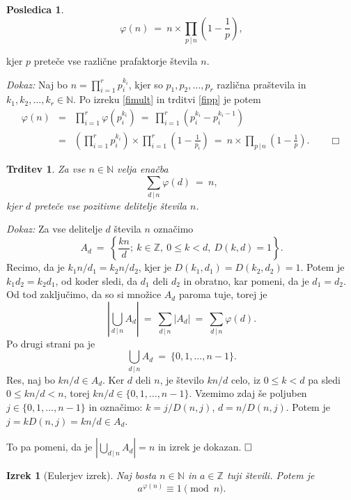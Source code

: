 \documentclass[a4paper,12pt]{article}
\def\N{\mathbb{N}} %
\def\Z{\mathbb{Z}} %
\def\qed{$\hfill\Box$}   %
\def\qedm{\qquad\Box}   %
\newtheorem{izrek}{Izrek}
\newtheorem{trditev}{Trditev}
\newtheorem{posledica}{Posledica}
\begin{document}
\begin{posledica}
\[
\varphi(n)\ =\ n \times \prod_{p\,|\,n} \left(1 - \frac{1}{p}\right),
\]
\end{posledica}
kjer $p$ preteče vse različne prafaktorje števila $n$.

\noindent
{\em Dokaz:\/} Naj bo $n = \prod_{i=1}^r p_i^{k_i}$,
kjer so $p_1, p_2, \ldots, p_r$ različna praštevila in $k_1, k_2, \ldots, k_r \in \N$. Po izreku 
\ref{fimult} in trditvi \ref{fipp} je potem
\begin{eqnarray*}
\varphi(n) &=& \prod_{i=1}^r \varphi\left(p_i^{k_i}\right)
\ =\ \prod_{i=1}^r \left(p_i^{k_i} - p_i^{k_i-1}\right) \\
 &=& \left(\prod_{i=1}^r p_i^{k_i}\right) \times \prod_{i=1}^r \left(1 - \frac{1}{p_i}\right)
\ =\ n \times \prod_{p\,|\,n} \left(1 - \frac{1}{p}\right). \qedm
\end{eqnarray*}


\begin{trditev}
Za vse $n \in \N$ velja enačba
\begin{equation}
\label{fisum}
\sum_{d\,|\,n} \varphi(d)\ =\  n,
\end{equation}
kjer $d$ preteče vse pozitivne delitelje števila $n$.
\end{trditev}

\noindent
{\em Dokaz:\/} Za vse delitelje $d$ števila $n$ označimo
\[
A_d\ =\ \left\{\frac{k n}{d};\ k \in \Z,\ 0 \le k < d,\ D(k,d) = 1\right\}.
\]
Recimo, da je $k_1 n/d_1 = k_2 n/d_2$, kjer je $D(k_1,d_1) = D(k_2,d_2) = 1$. Potem 
je $k_1 d_2 = k_2 d_1$, od koder sledi, da $d_1$ deli $d_2$ in obratno, kar pomeni,
da je $d_1 = d_2$. Od tod zaključimo, da so si množice $A_d$ paroma tuje,
torej je
\[
\left|\bigcup_{d\,|\,n} A_d\right|\ =\ \sum_{d\,|\,n} |A_d|\ =\ \sum_{d\,|\,n} \varphi(d).
\]
Po drugi strani pa je
\[
\bigcup_{d\,|\,n} A_d\ =\ \{0, 1, \ldots, n-1\}.
\]
Res, naj bo $k n/d \in A_d$. Ker $d$ deli $n$, je število $k n/d$ celo, iz $0 \le k < d$ pa sledi $0 \le k n/d < n$,
torej $k n/d \in \{0, 1, \ldots, n-1\}$. Vzemimo zdaj še poljuben $j \in \{0, 1, \ldots, n-1\}$
in označimo: $k = j/D(n,j)$, $d = n/D(n,j)$. Potem je $j = k D(n,j) = k n/d \in A_d$.

To pa pomeni, da je $\left|\bigcup_{d\,|\,n} A_d\right| = n$ in izrek je dokazan. \qed

\begin{izrek}[Eulerjev izrek]
Naj bosta $n \in \N$ in $a \in \Z$ tuji števili. Potem je
\[
a^{\varphi(n)} \equiv 1 \pmod{n}.
\]
\end{izrek}
\end{document}
